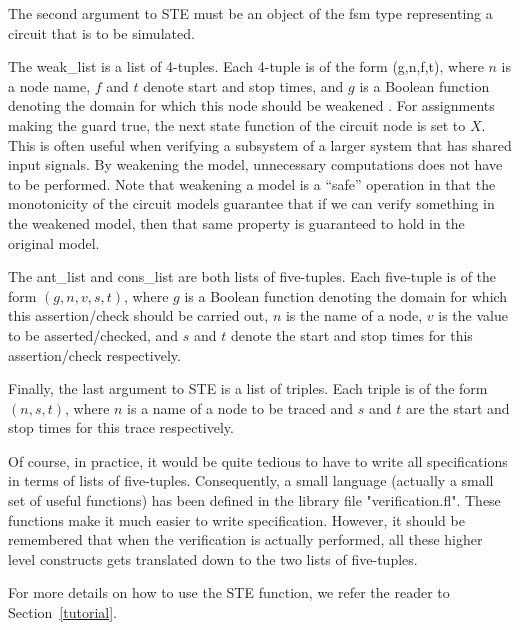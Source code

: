 The second argument to STE must be an object of the fsm type representing
a circuit that is to be simulated.

The weak\_list is a list of 4-tuples.
Each 4-tuple is of the form (g,n,f,t), where $n$ is a node name, $f$ and $t$
denote start and stop times, and $g$ is a Boolean function
denoting the domain for which this node should be weakened%
%
{}.
For assignments making the guard true, the next state function of the
circuit node is set to $X$.
This is often useful when verifying a subsystem of a larger system
that has shared input signals.
By weakening%
%
{} the model, unnecessary computations does not have
to be performed.
Note that weakening a model is a ``safe'' operation in that
the monotonicity of the circuit models guarantee that if we
can verify something in the weakened model, then that same property
is guaranteed to hold in the original model.

The ant\_list and cons\_list are  both lists of five-tuples.
Each five-tuple%
%
{} is of the form $(g,n,v,s,t)$, where $g$ is a Boolean function
denoting the domain for which this assertion/check should be carried out,
$n$ is the name of a node, $v$ is the value to be asserted/checked, and
$s$ and $t$ denote the start and stop times for this assertion/check
respectively.

Finally, the last argument to STE is a list of triples.
Each triple is of the form $(n,s,t)$, where $n$ is a name of a node
to be traced%
%
{} and $s$ and $t$ are the start and stop times for this
trace respectively.

Of course, in practice, it would be quite tedious to have to
write all specifications in terms of lists of five-tuples.
Consequently, a small language (actually a small set of useful functions)
has been defined in the library file "verification.fl".
These functions make it much easier to write specification.
However, it should be remembered that when the verification
is actually performed, all these higher level constructs gets translated
down to the two lists of five-tuples.

For more details on how to use the STE function, we refer the reader
to Section~\ref{tutorial}.
